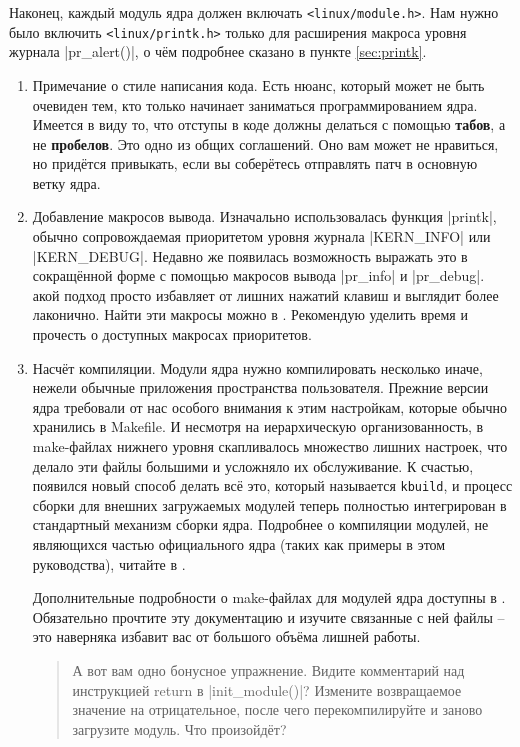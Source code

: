 \documentclass[10pt, oneside]{book}
\begin{document}
Наконец, каждый модуль ядра должен включать \verb|<linux/module.h>|.
Нам нужно было включить \verb|<linux/printk.h>| только для расширения макроса уровня журнала \cpp|pr_alert()|, о чём подробнее сказано в пункте \ref{sec:printk}.

\begin{enumerate}
  \item Примечание о стиле написания кода.
          Есть нюанс, который может не быть очевиден тем, кто только начинает заниматься программированием ядра. Имеется в
        виду то, что отступы в коде должны делаться с помощью \textbf{табов}, а не \textbf{пробелов}. Это одно из общих соглашений. Оно вам может не нравиться, но придётся привыкать, если вы соберётесь отправлять патч в основную ветку ядра.

  \item Добавление макросов вывода.
  \label{sec:printk}
        Изначально использовалась функция \cpp|printk|, обычно сопровождаемая приоритетом уровня журнала \cpp|KERN_INFO| или \cpp|KERN_DEBUG|.
        Недавно же появилась возможность выражать это в сокращённой форме с помощью макросов вывода \cpp|pr_info| и \cpp|pr_debug|.
        акой подход просто избавляет от лишних нажатий клавиш и выглядит более лаконично. Найти эти макросы можно в . Рекомендую уделить время и прочесть о доступных макросах приоритетов.

  \item Насчёт компиляции.
        Модули ядра нужно компилировать несколько иначе, нежели обычные приложения пространства пользователя. Прежние версии ядра требовали от нас особого внимания к этим настройкам, которые обычно хранились в Makefile. И несмотря на иерархическую организованность, в make-файлах нижнего уровня скапливалось множество лишних настроек, что делало эти файлы большими и усложняло их обслуживание. К счастью, появился новый способ делать всё это, который называется \verb|kbuild|, и процесс сборки для внешних загружаемых модулей теперь полностью интегрирован в стандартный механизм сборки ядра. Подробнее о компиляции модулей, не являющихся частью официального ядра (таких как примеры в этом руководства), читайте в .

        Дополнительные подробности о make-файлах для модулей ядра доступны в . Обязательно прочтите эту документацию и изучите связанные с ней файлы – это наверняка избавит вас от большого объёма лишней работы.

\begin{quote}
А вот вам одно бонусное упражнение. Видите комментарий над инструкцией return в \cpp|init_module()|?
Измените возвращаемое значение на отрицательное, после чего перекомпилируйте и заново загрузите модуль. Что произойдёт?
\end{quote}
\end{enumerate}
\end{document}
